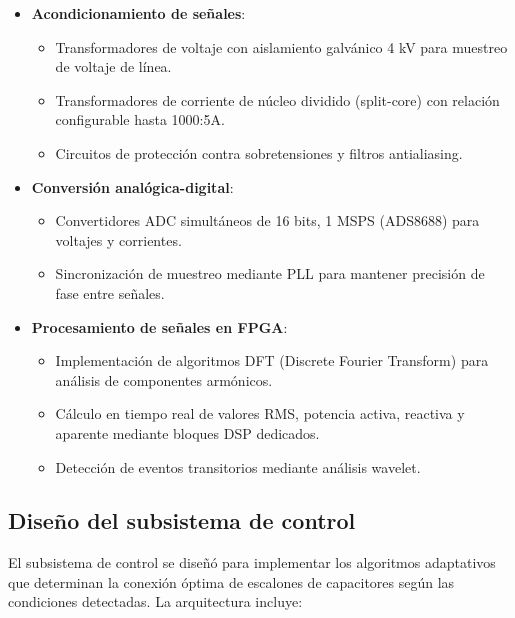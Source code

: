 \documentclass{report}          %
\begin{document}
                \begin{itemize}
                    \item \textbf{Acondicionamiento de señales}: 
                    \begin{itemize}
                        \item Transformadores de voltaje con aislamiento galvánico 4 kV para muestreo de voltaje de línea.
                        \item Transformadores de corriente de núcleo dividido (split-core) con relación configurable hasta 1000:5A.
                        \item Circuitos de protección contra sobretensiones y filtros antialiasing.
                    \end{itemize}
                    
                    \item \textbf{Conversión analógica-digital}: 
                    \begin{itemize}
                        \item Convertidores ADC simultáneos de 16 bits, 1 MSPS (ADS8688) para voltajes y corrientes.
                        \item Sincronización de muestreo mediante PLL para mantener precisión de fase entre señales.
                    \end{itemize}
                    
                    \item \textbf{Procesamiento de señales en FPGA}:
                    \begin{itemize}
                        \item Implementación de algoritmos DFT (Discrete Fourier Transform) para análisis de componentes armónicos.
                        \item Cálculo en tiempo real de valores RMS, potencia activa, reactiva y aparente mediante bloques DSP dedicados.
                        \item Detección de eventos transitorios mediante análisis wavelet.
                    \end{itemize}
                \end{itemize}

            \subsection{Diseño del subsistema de control}
                El subsistema de control se diseñó para implementar los algoritmos adaptativos que determinan la conexión óptima de escalones de capacitores según las condiciones detectadas. La arquitectura incluye:
                
\end{document}
